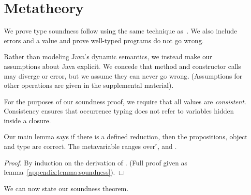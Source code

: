 \section{Metatheory}
\label{sec:metatheory}

We prove type soundness follow using the same technique as~\citet{TF10}. 
We also include errors and a \wrong{} value and prove
well-typed programs do not go wrong.

Rather than modeling Java's dynamic semantics, we instead
make our assumptions about Java explicit. We concede that
method and constructor calls may diverge or error, but we assume they can
never go wrong. (Assumptions for other operations are given in the supplemental
material).

{}





For the purposes of our soundness proof, we require that all values
are \emph{consistent}.
Consistency
ensures that occurrence typing does not refer to variables
hidden inside a closure.

{}

Our main lemma says if there is a defined reduction, then the propositions, object
and type are correct.
The metavariable  ranges over \v{}, \errorvalv{} and \wrong{}.

\begin{lemma}\label{main:lemma:soundness}

  {\soundnesslemmahypothesis}
  \begin{proof}
    By induction on the derivation of \opsem {\openv{}} {\e{}} {\a{}}.
    (Full proof given as lemma~\ref{appendix:lemma:soundness}).
  \end{proof}
\end{lemma}


We can now state our soundness theorem.

{}

{}
%
